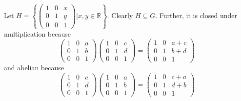 \documentclass[12pt]{article}
\newcommand{\R}{\mathbb{R}}
\begin{document}
    \color{blue}
        Let $H = \left\{\begin{pmatrix}
            1 & 0 & x\\
            0 & 1 & y\\
            0 & 0 & 1
        \end{pmatrix} \bigg\vert x, y \in \R\right\}$. Clearly $H \subseteq G$. Further, it is closed under multiplication because 
        \[\begin{pmatrix}
            1 & 0 & a\\
            0 & 1 & b\\
            0 & 0 & 1
        \end{pmatrix}\begin{pmatrix}
            1 & 0 & c\\
            0 & 1 & d\\
            0 & 0 & 1
        \end{pmatrix} = \begin{pmatrix}
            1 & 0 & a + c\\
            0 & 1 & b + d\\
            0 & 0 & 1
        \end{pmatrix}\]
        and abelian because 
        \[\begin{pmatrix}
            1 & 0 & c\\
            0 & 1 & d\\
            0 & 0 & 1
        \end{pmatrix} \begin{pmatrix}
            1 & 0 & a\\
            0 & 1 & b\\
            0 & 0 & 1
        \end{pmatrix} = \begin{pmatrix}
            1 & 0 & c + a\\
            0 & 1 & d + b\\
            0 & 0 & 1
        \end{pmatrix}\]
    
\end{document}
